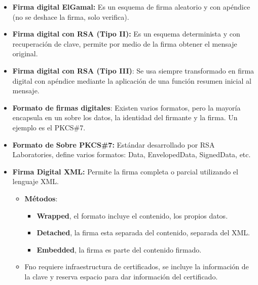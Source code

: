 \documentclass[12pt, twoside, openright]{report} %
\begin{document}
\begin{itemize}
\begin{itemize}
	      \end{itemize}
	\item \textbf{Firma digital ElGamal:} Es un esquema de firma aleatorio y con apéndice (no se deshace la firma, solo verifica).
	\item \textbf{Firma digital con RSA (Tipo II):} Es un esquema determinista y con recuperación de clave, permite por medio de la firma obtener el mensaje original.
	\item \textbf{Firma digital con RSA (Tipo III)}: Se usa siempre transformado en firma digital con apéndice mediante la aplicación de una función resumen inicial al mensaje.
	\item \textbf{Formato de firmas digitales}: Existen varios formatos, pero la mayoría encapsula en un sobre los datos, la identidad del firmante y la firma. Un ejemplo es el PKCS\#7.
	\item \textbf{Formato de Sobre PKCS\#7:} Estándar desarrollado por RSA Laboratories, define varios formatos: Data, EnvelopedData, SignedData, etc.
	\item \textbf{Firma Digital XML:} Permite la firma completa o parcial utilizando el lenguaje XML.
	      \begin{itemize}
		      \item \textbf{Métodos}:
		            \begin{itemize}
			            \item \textbf{Wrapped}, el formato incluye el contenido, los propios datos.
			            \item \textbf{Detached}, la firma esta separada del contenido, separada del XML.
			            \item \textbf{Embedded}, la firma es parte del contenido firmado.
		            \end{itemize}
		      \item Fno requiere infraestructura de certificados, se incluye la información de la clave y reserva espacio para dar información del certificado.
	      \end{itemize}
\end{itemize}
\end{document}
